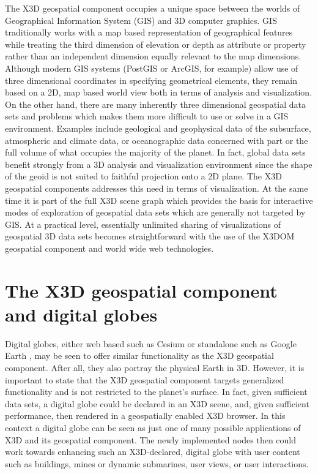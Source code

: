 \documentclass{acmsiggraph}                     %
\begin{document}
The X3D geospatial component occupies a unique space between the worlds of Geographical Information System (GIS) and 3D computer graphics. GIS traditionally works with a map based representation of geographical features while treating the third dimension of elevation or depth as attribute or property rather than an independent dimension equally relevant to the map dimensions. Although modern GIS systems (PostGIS or ArcGIS, for example) allow use of three dimensional coordinates in specifying geometrical elements, they remain based on a 2D, map based world view both in terms of analysis and visualization. On the other hand, there are many inherently three dimensional geospatial data sets and problems which makes them more difficult to use or solve in a GIS environment.  Examples include geological and geophysical data of the subsurface, atmospheric and climate data, or oceanographic data concerned with part or the full volume of what occupies the majority of the planet. In fact, global data sets benefit strongly from a 3D analysis and visualization environment since the shape of the geoid is not suited to faithful projection onto a 2D plane. The X3D geospatial components addresses this need in terms of visualization. At the same time it is part of the full X3D scene graph which provides the basis for interactive modes of exploration of geospatial data sets which are generally not targeted by GIS. At a practical level, essentially unlimited sharing of visualizations of geospatial 3D data sets becomes straightforward with the use of the X3DOM geospatial component and world wide web technologies.


\section{The X3D geospatial component and digital globes}

Digital globes, either web based such as Cesium \cite{cesium15} or standalone such as Google Earth \cite{googleearth15}, may be seen to offer similar functionality as the X3D geospatial component. After all, they also portray the physical Earth in 3D. However, it is important to state that the X3D geospatial component targets generalized functionality and is not restricted to the planet's surface. In fact, given sufficient data sets, a digital globe could be declared in an X3D scene, and, given sufficient performance, then rendered in a geospatially enabled X3D browser. In this context a digital globe can be seen as just one of many possible applications of X3D and its geospatial component. The newly implemented nodes then could work towards enhancing such an X3D-declared, digital globe with user content such as buildings, mines or dynamic submarines, user views, or user interactions.
\end{document}
